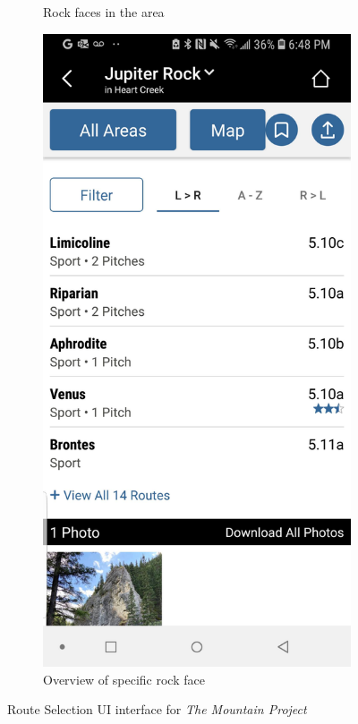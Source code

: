 \documentclass[10pt]{article}
\begin{document}
\begin{figure}[!h]
\begin{subfigure}[b]{0.3\textwidth}
      \caption{Rock faces in the area}
      \label{fig:face_list}
  \end{subfigure}
  \hfill
  \begin{subfigure}[b]{0.3\textwidth}
      \centering
      \includegraphics[width=\textwidth]{mp_jupiter_rock.jpg}
      \caption{Overview of specific rock face}
      \label{fig:face_overview}
  \end{subfigure}
  \caption{Route Selection UI interface for \emph{The Mountain Project}} 
\end{figure}
\end{document}
